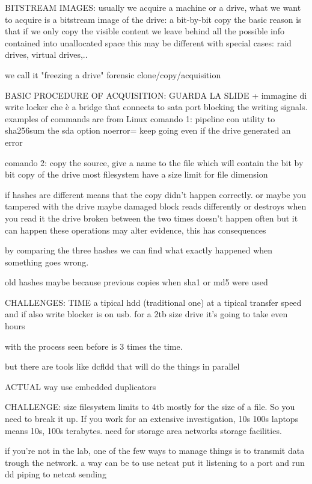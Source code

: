 BITSTREAM IMAGES:
    usually we acquire a machine or a drive, what we want to acquire is a bitstream image of the drive: a bit-by-bit copy 
    the basic reason is that if we only copy the visible content we leave behind all the possible info contained into unallocated space 
    this may be different with special cases: raid drives, virtual drives,..  

    we call it "freezing a drive"
    forensic clone/copy/acquisition 

BASIC PROCEDURE OF ACQUISITION:
    GUARDA LA SLIDE 
    + immagine di write locker che è a bridge that connects to sata port blocking the writing signals.
    examples of commands are from Linux 
    comando 1: pipeline con utility to sha256sum the sda 
        option noerror= keep going even if the drive generated an error 

    comando 2: copy the source, give a name to the file which will contain the bit by bit copy of the drive 
    most filesystem have a size limit for file dimension

    if hashes are different means that the copy didn't happen correctly.
    or maybe you tampered with the drive 
    maybe damaged block reads differently or destroys when you read it 
    the drive broken between the two times 
    doesn't happen often but it can happen 
    these operations may alter evidence, this has consequences 

    by comparing the three hashes we can find what exactly happened when something goes wrong. 

    old hashes maybe because previous copies when sha1 or md5 were used 

CHALLENGES: TIME 
    a tipical hdd (traditional one) at a tipical transfer speed and if also write blocker is on usb.
    for a 2tb size drive it's going to take even hours 

    with the process seen before is 3 times the time.

    but there are tools like dcfldd that will do the things in parallel 

ACTUAL way
    use embedded duplicators

CHALLENGE: size 
    filesystem limits to 4tb mostly for the size of a file. So you need to break it up.
    If you work for an extensive investigation, 10s 100s laptops means 10s, 100s terabytes.
    need for storage area networks storage facilities.

    if you're not in the lab, one of the few ways to manage things is to transmit data trough the network.
    a way can be to use netcat
    put it listening to a port 
    and run dd piping to netcat sending 

